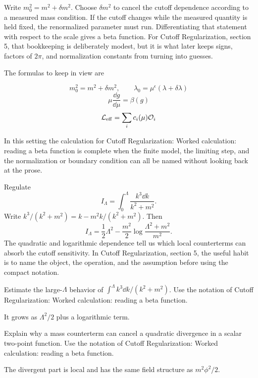 Write \(m_0^2=m^2+\delta m^2\).  Choose \(\delta m^2\) to cancel the cutoff dependence according to a measured mass condition.  If the cutoff changes while the measured quantity is held fixed, the renormalized parameter must run.  Differentiating that statement with respect to the scale gives a beta function.  For Cutoff Regularization, section 5, that bookkeeping is deliberately modest, but it is what later keeps signs, factors of \(2\pi\), and normalization constants from turning into guesses.

The formulas to keep in view are

\[
  m_0^2=m^2+\delta m^2,\qquad \lambda_0=\mu^\epsilon(\lambda+\delta\lambda)
\]
\[
  \mu\frac{\dd g}{\dd\mu}=\beta(g)
\]
\[
  \mathcal L_{\mathrm{eff}}=\sum_i c_i(\mu)\mathcal O_i
\]

In this setting the calculation for Cutoff Regularization: Worked calculation: reading a beta function is complete when the finite model, the limiting step, and the normalization or boundary condition can all be named without looking back at the prose.




\begin{example}
Regulate
\[
  I_\Lambda=\int_0^\Lambda\frac{k^3\dd k}{k^2+m^2}.
\]
Write \(k^3/(k^2+m^2)=k-m^2k/(k^2+m^2)\).  Then
\[
  I_\Lambda=\frac12\Lambda^2-\frac{m^2}{2}\log\frac{\Lambda^2+m^2}{m^2}.
\]
The quadratic and logarithmic dependence tell us which local counterterms can absorb the cutoff sensitivity.  In Cutoff Regularization, section 5, the useful habit is to name the object, the operation, and the assumption before using the compact notation.
\end{example}



\begin{exercise}
Estimate the large-\(\Lambda\) behavior of \(\int^\Lambda k^3\dd k/(k^2+m^2)\).  Use the notation of Cutoff Regularization: Worked calculation: reading a beta function.
\begin{answer}
It grows as \(\Lambda^2/2\) plus a logarithmic term.
\end{answer}
\end{exercise}

\begin{exercise}
Explain why a mass counterterm can cancel a quadratic divergence in a scalar two-point function.  Use the notation of Cutoff Regularization: Worked calculation: reading a beta function.
\begin{answer}
The divergent part is local and has the same field structure as \(m^2\phi^2/2\).
\end{answer}
\end{exercise}



